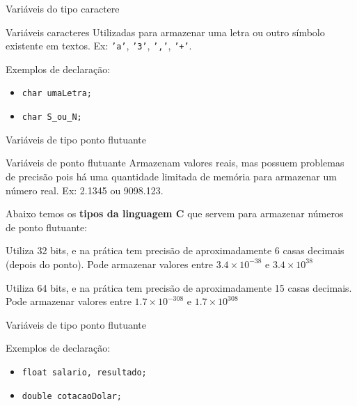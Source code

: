 \documentclass[handout]{beamer}
\begin{document}
\begin{frame}{Variáveis do tipo caractere}

    \begin{block}{Variáveis caracteres}
        Utilizadas para armazenar uma letra ou outro símbolo existente em textos.
        Ex: \texttt{'a'}, \texttt{'3'}, \texttt{','}, \texttt{'+'}.
    \end{block}

    \pause
    Exemplos de declaração:
    \begin{itemize}
        \item \texttt{char umaLetra;}
        \item \texttt{char S\_ou\_N;}
    \end{itemize}
\end{frame}

\begin{frame}{Variáveis de tipo ponto flutuante}

    \begin{block}{Variáveis de ponto flutuante}
        Armazenam valores reais, mas possuem problemas de precisão pois há uma quantidade limitada de memória para armazenar um número real.
        Ex: 2.1345 ou 9098.123.
    \end{block}

    \pause
    Abaixo temos os {\bf tipos da linguagem C} que servem para armazenar números de ponto flutuante:
    \begin{description}[<+->]
        \item[float] Utiliza 32 bits, e na prática tem precisão de aproximadamente 6 casas decimais (depois do ponto). Pode armazenar valores entre $3.4 \times 10^{-38}$ e $3.4 \times 10^{38}$
        \item[double] Utiliza 64 bits, e na prática tem precisão de aproximadamente 15 casas decimais. Pode armazenar valores entre $1.7 \times 10^{-308}$ e $1.7 \times 10^{308}$
    \end{description}
\end{frame}

\begin{frame}{Variáveis de tipo ponto flutuante}

    Exemplos de declaração:
    \begin{itemize}
        \item \texttt{float salario, resultado;}
        \item \texttt{double cotacaoDolar;}
    \end{itemize}
\end{frame}
\end{document}
